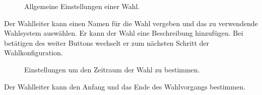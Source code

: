 \documentclass[parskip=full,11pt,twoside]{scrartcl}
\begin{document}
\begin{figure}[H]
	\caption{\label{fig:wlltr-general}
		Allgemeine Einstellungen einer Wahl.
	}
\end{figure}
Der Wahlleiter kann einen Namen für die Wahl vergeben und das zu verwendende Wahlsystem auswählen.
Er kann der Wahl eine Beschreibung hinzufügen.
Bei betätigen des weiter Buttons wechselt er zum nächsten Schritt der Wahlkonfiguration.

\begin{figure}[H]
	\caption{\label{fig:wlltr-time}
		Einstellungen um den Zeitraum der Wahl zu bestimmen.
	}
\end{figure}
Der Wahlleiter kann den Anfang und das Ende des Wahlvorgangs bestimmen.
\end{document}
